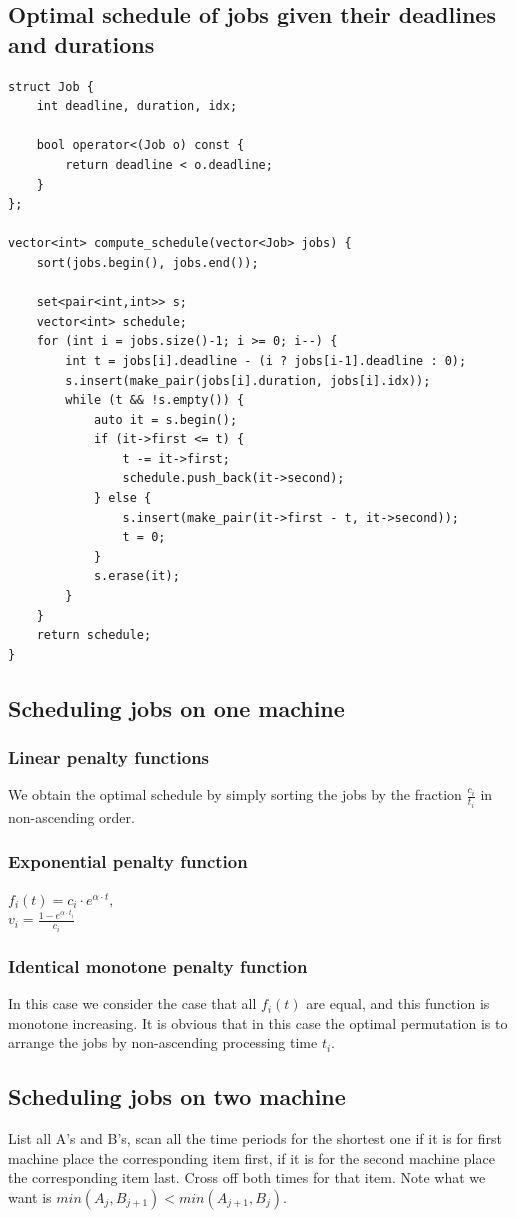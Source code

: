 \documentclass[8pt, a4paper, oneside, twocolumn]{extarticle}
\begin{document}
\subsection{Optimal schedule of jobs given their deadlines and durations}
\begin{verbatim}
struct Job {
    int deadline, duration, idx;

    bool operator<(Job o) const {
        return deadline < o.deadline;
    }
};

vector<int> compute_schedule(vector<Job> jobs) {
    sort(jobs.begin(), jobs.end());

    set<pair<int,int>> s;
    vector<int> schedule;
    for (int i = jobs.size()-1; i >= 0; i--) {
        int t = jobs[i].deadline - (i ? jobs[i-1].deadline : 0);
        s.insert(make_pair(jobs[i].duration, jobs[i].idx));
        while (t && !s.empty()) {
            auto it = s.begin();
            if (it->first <= t) {
                t -= it->first;
                schedule.push_back(it->second);
            } else {
                s.insert(make_pair(it->first - t, it->second));
                t = 0;
            }
            s.erase(it);
        }
    }
    return schedule;
}
\end{verbatim}
\subsection{Scheduling jobs on one machine}
\subsubsection{Linear penalty functions}
We obtain the optimal schedule by simply sorting the jobs by the fraction $\frac{c_i}{t_i}$ in non-ascending order.
\subsubsection{Exponential penalty function}
$f_i(t) = c_i \cdot e^{\alpha \cdot t},$ 
\\$v_i = \frac{1 - e^{\alpha \cdot t_i}}{c_i}$
\subsubsection{Identical monotone penalty function}
In this case we consider the case that all $f_i(t)$ are equal, and this function is monotone increasing.
It is obvious that in this case the optimal permutation is to arrange the jobs by non-ascending processing time $t_i$.
\subsection{Scheduling jobs on two machine}
List all A's and B's, scan all the time periods for the shortest one if it is for first machine place the corresponding item first, if it is for the second machine place the corresponding item last. Cross off both times for that item. Note what we want is $min (A_j, B_{j + 1}) < min (A_{j + 1}, B_j)$.
\end{document}
